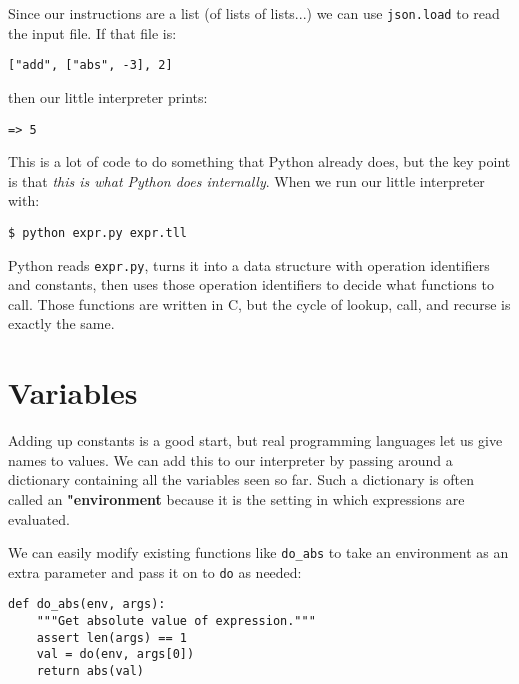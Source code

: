 \documentclass{scrbook}
\newcommand{\glossref}[1]{\textbf{#1}}
\begin{document}
Since our instructions are a list (of lists of lists...)
we can use \texttt{json.load} to read the input file.
If that file is:


\begin{lstlisting}[frame=single,frameround=tttt]
["add", ["abs", -3], 2]
\end{lstlisting}



\noindent then our little interpreter prints:


\begin{lstlisting}[frame=single,frameround=tttt]
=> 5
\end{lstlisting}



This is a lot of code to do something that Python already does,
but the key point is that
\emph{this is what Python does internally}.
When we run our little interpreter with:

\begin{lstlisting}[frame=single,frameround=tttt]
$ python expr.py expr.tll
\end{lstlisting}


Python reads \texttt{expr.py},
turns it into a data structure with operation identifiers and constants,
then uses those operation identifiers to decide what functions to call.
Those functions are written in C,
but the cycle of lookup, call, and recurse is exactly the same.

\section{Variables}\label{interpreter-variables}


Adding up constants is a good start,
but real programming languages let us give names to values.
We can add this to our interpreter
by passing around a dictionary containing all the variables seen so far.
Such a dictionary is often called an \glossref{"environment}
because it is the setting in which expressions are evaluated.


We can easily modify existing functions like \texttt{do\_abs}
to take an environment as an extra parameter and pass it on to \texttt{do} as needed:


\begin{lstlisting}[frame=single,frameround=tttt]
def do_abs(env, args):
    """Get absolute value of expression."""
    assert len(args) == 1
    val = do(env, args[0])
    return abs(val)
\end{lstlisting}
\end{document}
